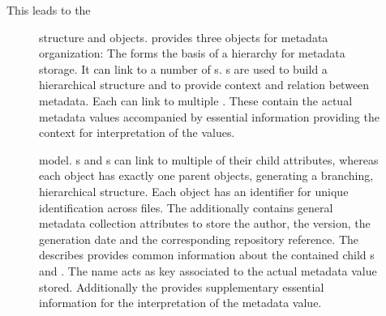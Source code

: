 This leads to the 


\begin{figure}
    \centering
    
    \caption[ structure and objects]{ structure and objects.  provides three objects for metadata organization: The   forms the basis of a hierarchy for metadata storage. It can link to a number of  s. s are used to build a hierarchical structure and to provide context and relation between metadata. Each  can link to multiple . These contain the actual metadata values accompanied by essential information providing the context for interpretation of the values.}
    \label{fig:intro_odML_structure}
\end{figure}

\begin{figure}
    \centering
    
    \caption[ model]{ model. s and s can link to multiple of their child attributes, whereas each object has exactly one parent objects, generating a branching, hierarchical structure. Each object has an identifier  for unique identification across files. The  additionally contains general metadata collection attributes to store the author, the version, the generation date and the corresponding repository reference. The  describes provides common information about the contained child s and . The  name acts as key associated to the actual metadata value stored. Additionally the  provides supplementary essential information for the interpretation of the metadata value.}
    \label{fig:intro_odML_model}
\end{figure}

